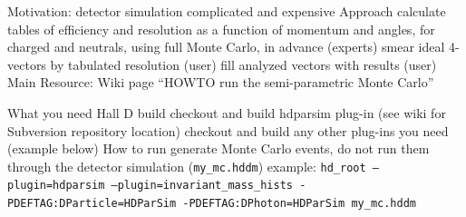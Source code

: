 \documentclass[xcolor=dvipsnames]{beamer}
\begin{document}
\f{
  \be
  \I Motivation: detector simulation complicated and expensive
  \I Approach
    \be
    \I calculate tables of efficiency and resolution as a function of momentum
    and angles, for charged and neutrals, using full Monte Carlo, in advance
    (experts)
    \I smear ideal 4-vectors by tabulated resolution (user)
    \I fill analyzed vectors with results (user)
    \ee
  \I Main Resource: Wiki page ``HOWTO run the semi-parametric Monte Carlo''
  \ee
}

\f{
  \be
  \I What you need
    \be
    \I Hall D build
    \I checkout and build hdparsim plug-in (see wiki for Subversion repository
    location)
    \I checkout and build any other plug-ins you need (example below)
    \ee
  \I How to run
    \be
    \I generate Monte Carlo events, do not run them through the detector
    simulation ({\tt my\_mc.hddm})
    \I example: {\tt hd\_root --plugin=hdparsim --plugin=invariant\_mass\_hists
      -PDEFTAG:DParticle=HDParSim -PDEFTAG:DPhoton=HDParSim my\_mc.hddm}
    \ee
  \ee
}
\end{document}
